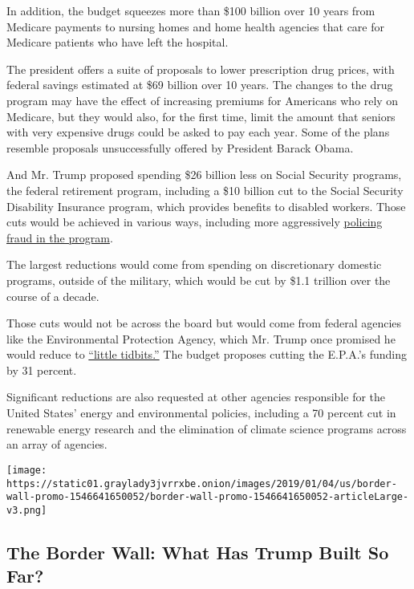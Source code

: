 In addition, the budget squeezes more than \$100 billion over 10 years
from Medicare payments to nursing homes and home health agencies that
care for Medicare patients who have left the hospital.

The president offers a suite of proposals to lower prescription drug
prices, with federal savings estimated at \$69 billion over 10 years.
The changes to the drug program may have the effect of increasing
premiums for Americans who rely on Medicare, but they would also, for
the first time, limit the amount that seniors with very expensive drugs
could be asked to pay each year. Some of the plans resemble proposals
unsuccessfully offered by President Barack Obama.

And Mr. Trump proposed spending \$26 billion less on Social Security
programs, the federal retirement program, including a \$10 billion cut
to the Social Security Disability Insurance program, which provides
benefits to disabled workers. Those cuts would be achieved in various
ways, including more aggressively
\href{https://www.nytimes3xbfgragh.onion/2019/03/10/us/politics/social-security-disability-trump-facebook.html}{policing
fraud in the program}.

The largest reductions would come from spending on discretionary
domestic programs, outside of the military, which would be cut by \$1.1
trillion over the course of a decade.

Those cuts would not be across the board but would come from federal
agencies like the Environmental Protection Agency, which Mr. Trump once
promised he would reduce to
\href{https://www.nytimes3xbfgragh.onion/2016/03/19/us/politics/epa-faces-bigger-tasks-smaller-budgets-and-louder-critics.html}{``little
tidbits.''} The budget proposes cutting the E.P.A.'s funding by 31
percent.

Significant reductions are also requested at other agencies responsible
for the United States' energy and environmental policies, including a 70
percent cut in renewable energy research and the elimination of climate
science programs across an array of agencies.

\href{https://www.nytimes3xbfgragh.onion/interactive/2019/01/05/us/border-wall.html}{}

\texttt{[image: https://static01.graylady3jvrrxbe.onion/images/2019/01/04/us/border-wall-promo-1546641650052/border-wall-promo-1546641650052-articleLarge-v3.png]}

\hypertarget{the-border-wall-what-has-trump-built-so-far}{%
\subsection{The Border Wall: What Has Trump Built So
Far?}\label{the-border-wall-what-has-trump-built-so-far}}

